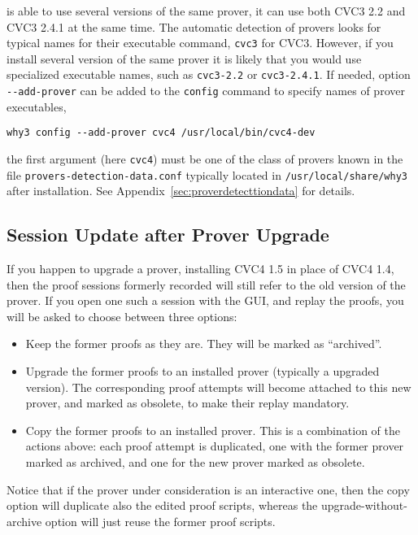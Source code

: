 \why is able to use several versions of the same
prover, \eg it can use both CVC3 2.2 and CVC3 2.4.1 at the same time.
The automatic detection of provers looks for typical names for their
executable command, \eg \texttt{cvc3} for CVC3. However, if you
install several version of the same prover it is likely that you would
use specialized executable names, such as \texttt{cvc3-2.2} or
\texttt{cvc3-2.4.1}. If needed, option \verb|--add-prover| can be
added to the \texttt{config} command to specify names of prover executables, \eg
{}
\begin{verbatim}
why3 config --add-prover cvc4 /usr/local/bin/cvc4-dev
\end{verbatim}
the first argument (here \verb|cvc4|) must be one of the class of
provers known in the file \verb|provers-detection-data.conf| typically
located in \verb|/usr/local/share/why3| after installation. See
Appendix~\ref{sec:proverdetecttiondata} for details.


\subsection{Session Update after Prover Upgrade}
\label{sec:uninstalledprovers}

If you happen to upgrade a prover, \eg installing CVC4 1.5 in place
of CVC4 1.4, then the proof sessions formerly recorded will still
refer to the old version of the prover. If you open one such a session
with the GUI, and replay the proofs, you will be asked to choose
between three options:
\begin{itemize}
\item Keep the former proofs as they are. They will be marked as
  ``archived''.
\item Upgrade the former proofs to an installed prover (typically a
  upgraded version). The corresponding proof attempts will become
  attached to this new prover, and marked as obsolete,
  to make their replay mandatory.
\item Copy the former proofs to an installed prover. This is a
  combination of the actions above: each proof attempt is duplicated,
  one with the former prover marked as archived, and one for the new
  prover marked as obsolete.
\end{itemize}

Notice that if the prover under consideration is an interactive one, then
the copy option will duplicate also the edited proof scripts, whereas
the upgrade-without-archive option will just reuse the former proof scripts.

